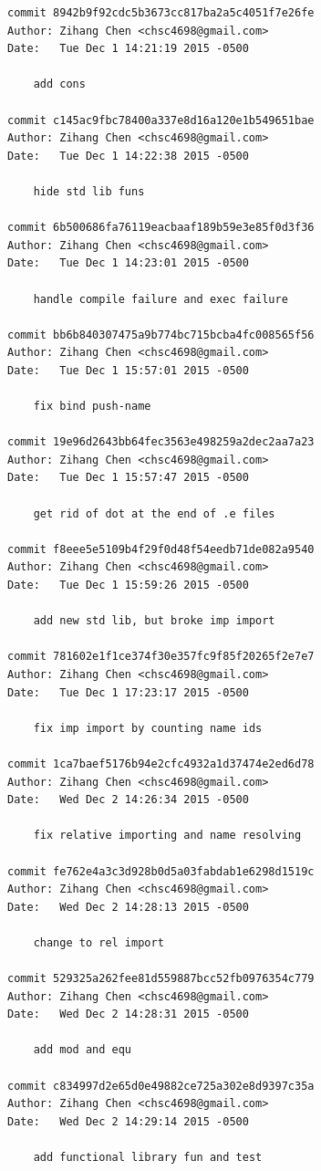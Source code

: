 \documentclass{report}
\begin{document}
\begin{appendices}
\begin{verbatim}
commit 8942b9f92cdc5b3673cc817ba2a5c4051f7e26fe
Author: Zihang Chen <chsc4698@gmail.com>
Date:   Tue Dec 1 14:21:19 2015 -0500

    add cons

commit c145ac9fbc78400a337e8d16a120e1b549651bae
Author: Zihang Chen <chsc4698@gmail.com>
Date:   Tue Dec 1 14:22:38 2015 -0500

    hide std lib funs

commit 6b500686fa76119eacbaaf189b59e3e85f0d3f36
Author: Zihang Chen <chsc4698@gmail.com>
Date:   Tue Dec 1 14:23:01 2015 -0500

    handle compile failure and exec failure

commit bb6b840307475a9b774bc715bcba4fc008565f56
Author: Zihang Chen <chsc4698@gmail.com>
Date:   Tue Dec 1 15:57:01 2015 -0500

    fix bind push-name

commit 19e96d2643bb64fec3563e498259a2dec2aa7a23
Author: Zihang Chen <chsc4698@gmail.com>
Date:   Tue Dec 1 15:57:47 2015 -0500

    get rid of dot at the end of .e files

commit f8eee5e5109b4f29f0d48f54eedb71de082a9540
Author: Zihang Chen <chsc4698@gmail.com>
Date:   Tue Dec 1 15:59:26 2015 -0500

    add new std lib, but broke imp import

commit 781602e1f1ce374f30e357fc9f85f20265f2e7e7
Author: Zihang Chen <chsc4698@gmail.com>
Date:   Tue Dec 1 17:23:17 2015 -0500

    fix imp import by counting name ids

commit 1ca7baef5176b94e2cfc4932a1d37474e2ed6d78
Author: Zihang Chen <chsc4698@gmail.com>
Date:   Wed Dec 2 14:26:34 2015 -0500

    fix relative importing and name resolving

commit fe762e4a3c3d928b0d5a03fabdab1e6298d1519c
Author: Zihang Chen <chsc4698@gmail.com>
Date:   Wed Dec 2 14:28:13 2015 -0500

    change to rel import

commit 529325a262fee81d559887bcc52fb0976354c779
Author: Zihang Chen <chsc4698@gmail.com>
Date:   Wed Dec 2 14:28:31 2015 -0500

    add mod and equ

commit c834997d2e65d0e49882ce725a302e8d9397c35a
Author: Zihang Chen <chsc4698@gmail.com>
Date:   Wed Dec 2 14:29:14 2015 -0500

    add functional library fun and test


\end{verbatim}
\end{appendices}
\end{document}
